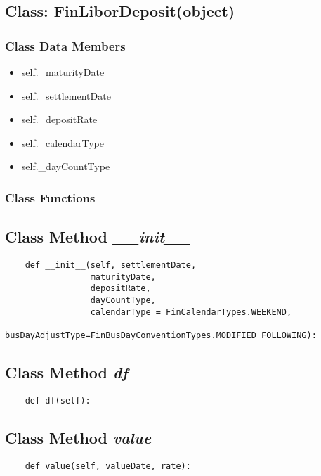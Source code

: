 \documentclass[twoside,11pt]{book}
\begin{document}
\subsection{Class: FinLiborDeposit(object)}


\subsubsection{Class Data Members}
\begin{itemize}
\item{self.\_maturityDate}
\item{self.\_settlementDate}
\item{self.\_depositRate}
\item{self.\_calendarType}
\item{self.\_dayCountType}
\end{itemize}

\subsubsection{Class Functions}

\subsection{Class Method {\it \_\_init\_\_}}


\begin{lstlisting}
    def __init__(self, settlementDate, 
                 maturityDate, 
                 depositRate, 
                 dayCountType, 
                 calendarType = FinCalendarTypes.WEEKEND,
                 busDayAdjustType=FinBusDayConventionTypes.MODIFIED_FOLLOWING):
\end{lstlisting}

\subsection{Class Method {\it df}}


\begin{lstlisting}
    def df(self):
\end{lstlisting}

\subsection{Class Method {\it value}}


\begin{lstlisting}
    def value(self, valueDate, rate):
\end{lstlisting}
\end{document}
